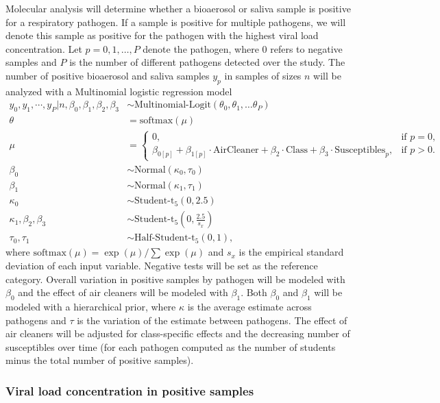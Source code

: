 \documentclass{article}
\begin{document}
Molecular analysis will determine whether a bioaerosol or saliva sample is positive for a respiratory pathogen. If a sample is positive for multiple pathogens, we will denote this sample as positive for the pathogen with the highest viral load concentration. Let $p = 0, 1, \dots, P$ denote the pathogen, where $0$ refers to negative samples and $P$ is the number of different pathogens detected over the study. The number of positive bioaerosol and saliva samples $y_p$ in samples of sizes $n$ will be analyzed with a Multinomial logistic regression model
\begin{align*}
    y_0, y_1, \cdots, y_P | n, \beta_0, \beta_1, \beta_2, \beta_3 &\sim \text{Multinomial-Logit}(\theta_0, \theta_1, \dots \theta_P) \\
    \theta &= \text{softmax}(\mu) \\
    \mu &= \begin{cases}
                0, & \text{if } p=0, \\
                \beta_{0[p]} + \beta_{1[p]} \cdot \text{AirCleaner} + \beta_2 \cdot \text{Class} + \beta_3 \cdot \text{Susceptibles}_p, & \text{if } p>0.
            \end{cases} \\
    \beta_0 &\sim \text{Normal}(\kappa_0, \tau_0) \\
    \beta_1 &\sim \text{Normal}(\kappa_1, \tau_1) \\
    \kappa_0 &\sim \text{Student-t}_5(0, 2.5) \\
    \kappa_1, \beta_2, \beta_3 &\sim \text{Student-t}_5\left(0, \frac{2.5}{s_{x}}\right) \\
    \tau_0, \tau_1 &\sim \text{Half-Student-t}_5(0,1),
\end{align*}
where $\text{softmax}(\mu) = \exp(\mu)/\sum\exp(\mu)$ and $s_{x}$ is the empirical standard deviation of each input variable.  Negative tests will be set as the reference category. Overall variation in positive samples by pathogen will be modeled with $\beta_0$ and the effect of air cleaners will be modeled with $\beta_1$. Both $\beta_0$ and $\beta_1$ will be modeled with a hierarchical prior, where $\kappa$ is the average estimate across pathogens and $\tau$ is the variation of the estimate between pathogens. The effect of air cleaners will be adjusted for class-specific effects and the decreasing number of susceptibles over time (for each pathogen computed as the number of students minus the total number of positive samples). 

\subsubsection{Viral load concentration in positive samples}\label{subsubsec:viral_load}
\end{document}

